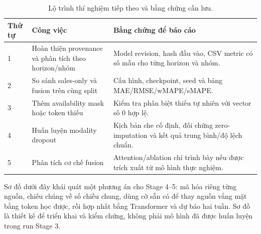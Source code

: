 \documentclass[12pt,a4paper,oneside]{article}
\begin{document}
\begin{table}[!htbp]
\centering
\small
\caption{Lộ trình thí nghiệm tiếp theo và bằng chứng cần lưu.}
\label{tab:roadmap}
\begin{tabularx}{\textwidth}{p{}p{}X}
\toprule
Thứ tự & Công việc & Bằng chứng để báo cáo \\
\midrule
1 & Hoàn thiện provenance và phân tích theo horizon/nhóm & Model revision, hash đầu vào, CSV metric có số mẫu cho từng horizon và nhóm. \\
2 & So sánh sales-only và fusion trên cùng split & Cấu hình, checkpoint, seed và bảng MAE/RMSE/wMAPE/sMAPE. \\
3 & Thêm availability mask hoặc token thiếu & Kiểm tra phân biệt thiếu tự nhiên với vector số 0 hợp lệ. \\
4 & Huấn luyện modality dropout & Kịch bản che cố định, đối chứng zero-imputation và kết quả trung bình/độ lệch chuẩn. \\
5 & Phân tích cơ chế fusion & Attention/ablation chỉ trình bày nếu được trích xuất từ mô hình thực nghiệm. \\
\bottomrule
\end{tabularx}
\end{table}

Sơ đồ dưới đây khái quát một phương án cho Stage 4--5: mã hóa riêng từng nguồn, chiếu chúng về số chiều chung, dùng cờ sẵn có để thay nguồn vắng mặt bằng token học được, rồi hợp nhất bằng Transformer và dự báo hai tuần. Sơ đồ là thiết kế để triển khai và kiểm chứng, không phải mô hình đã được huấn luyện trong run Stage 3.
\end{document}
